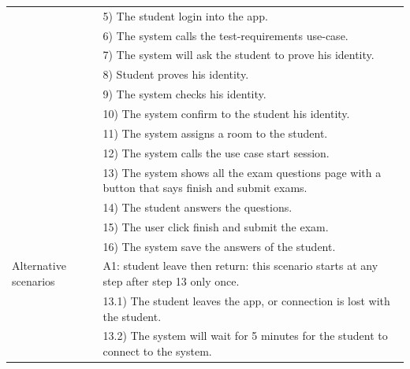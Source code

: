 \documentclass[]{uc2pfecaneva}
\begin{document}
\begin{table}[h]
\begin{tabularx}{\textwidth}{|l|X|}
		                      & 5) The student login into the app.                                                                \\
		                      & 6) The system calls the test-requirements use-case.                                               \\
		                      & 7) The system will ask the student to prove his identity.                                         \\
		                      & 8) Student proves his identity.                                                                   \\
		                      & 9) The system checks his identity.                                                                \\
		                      & 10) The system confirm to the student his identity.                                               \\
		                      & 11) The system assigns a room to the student.                                                     \\
		                      & 12) The system calls the use case start session.                                                  \\
		                      & 13) The system shows all the exam questions page with a button that says finish and submit exams. \\
		                      & 14) The student answers the questions.                                                            \\
		                      & 15) The user click finish and submit the exam.                                                    \\
		                      & 16) The system save the answers of the student.                                                   \\ \hline
		Alternative scenarios
		                      & A1: student leave then return: this scenario starts at any step after step 13 only once.          \\
		                      & \hspace{4mm}13.1) The student leaves the app, or connection is lost with the student.             \\
		                      & \hspace{4mm}13.2) The system will wait for 5 minutes for the student to connect to the system.    \\

\end{tabularx}
\end{table}
\end{document}
